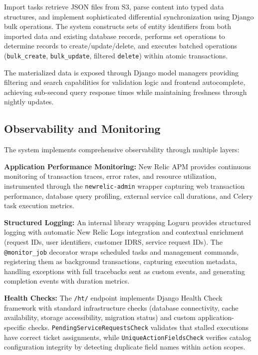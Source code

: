 Import tasks retrieve JSON files from S3, parse content into typed data structures, and implement sophisticated differential synchronization using Django bulk operations. The system constructs sets of entity identifiers from both imported data and existing database records, performs set operations to determine records to create/update/delete, and executes batched operations (\texttt{bulk\_create}, \texttt{bulk\_update}, filtered \texttt{delete}) within atomic transactions.

The materialized data is exposed through Django model managers providing filtering and search capabilities for validation logic and frontend autocomplete, achieving sub-second query response times while maintaining freshness through nightly updates.

\subsection{Observability and Monitoring}

The system implements comprehensive observability through multiple layers:

\textbf{Application Performance Monitoring:} New Relic APM provides continuous monitoring of transaction traces, error rates, and resource utilization, instrumented through the \texttt{newrelic-admin} wrapper capturing web transaction performance, database query profiling, external service call durations, and Celery task execution metrics.

\textbf{Structured Logging:} An internal library wrapping Loguru provides structured logging with automatic New Relic Logs integration and contextual enrichment (request IDs, user identifiers, customer IDRS, service request IDs). The \texttt{@monitor\_job} decorator wraps scheduled tasks and management commands, registering them as background transactions, capturing execution metadata, handling exceptions with full tracebacks sent as custom events, and generating completion events with duration metrics.

\textbf{Health Checks:} The \texttt{/ht/} endpoint implements Django Health Check framework with standard infrastructure checks (database connectivity, cache availability, storage accessibility, migration status) and custom application-specific checks. \texttt{PendingServiceRequestsCheck} validates that stalled executions have correct ticket assignments, while \texttt{UniqueActionFieldsCheck} verifies catalog configuration integrity by detecting duplicate field names within action scopes.

